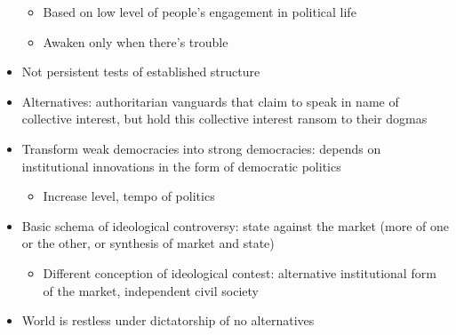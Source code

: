 \begin{itemize}
  \begin{itemize}
  \tightlist
  \item
    Based on low level of people's engagement in political life
  \item
    Awaken only when there's trouble
  \end{itemize}
\item
  Not persistent tests of established structure
\item
  Alternatives: authoritarian vanguards that claim to speak in name of
  collective interest, but hold this collective interest ransom to their
  dogmas
\item
  Transform weak democracies into strong democracies: depends on
  institutional innovations in the form of democratic politics

  \begin{itemize}
  \tightlist
  \item
    Increase level, tempo of politics
  \end{itemize}
\item
  Basic schema of ideological controversy: state against the market
  (more of one or the other, or synthesis of market and state)

  \begin{itemize}
  \tightlist
  \item
    Different conception of ideological contest: alternative
    institutional form of the market, independent civil society
  \end{itemize}
\item
  World is restless under dictatorship of no alternatives
\end{itemize}
